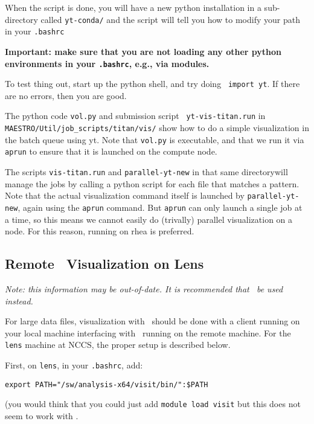 When the script is done, you will have a new python installation in a sub-directory
called {\tt yt-conda/} and the script will tell you how to modify your path
in your {\tt .bashrc}

{\bfseries Important: make sure that you are not loading any other
  python environments in your {\tt .bashrc}, e.g., via modules.}

To test thing out, start up the python shell, and try doing {\tt
  import yt}.  If there are no errors, then you are good.

The python code {\tt vol.py} and submission script {\tt
  yt-vis-titan.run} in {\tt MAESTRO/Util/job\_scripts/titan/vis/} show
how to do a simple visualization in the batch queue using yt.  Note
that {\tt vol.py} is executable, and that we run it via {\tt aprun} to
ensure that it is launched on the compute node.

The scripts {\tt vis-titan.run} and {\tt parallel-yt-new} in that
same directorywill manage the \yt jobs by calling a
python script for each file that matches a pattern.  
Note that the actual visualization command itself is launched by
{\tt parallel-yt-new}, again using the {\tt aprun} command.  But
{\tt aprun} can only launch a single job at a time, so this means
we cannot easily do (trivally) parallel visualization on a node.  For
this reason, running on rhea is preferred.


\subsection{Remote \visit\ Visualization on Lens}

{\em Note: this information may be out-of-date.  It is recommended that
 \yt\ be used instead.}

For large data files, visualization with \visit\ should be done with
a client running on your local machine interfacing with \visit\ running
on the remote machine.  For the {\tt lens} machine at NCCS, the proper setup
is described below.

First, on {\tt lens}, in your {\tt .bashrc}, add:
\begin{verbatim}
export PATH="/sw/analysis-x64/visit/bin/":$PATH
\end{verbatim}
(you would think that you could just add {\tt module load visit} but this
does not seem to work with \visit.


